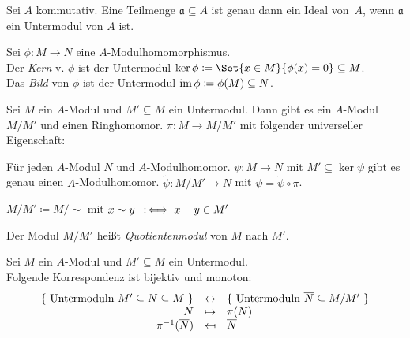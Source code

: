 \documentclass{cheat-sheet}
\newcommand{\aaa}{\mathfrak{a}}
\begin{document}
\begin{bsp}
  Sei $A$ kommutativ.
  Eine Teilmenge $\aaa \subseteq A$ ist genau dann ein Ideal von~$A$, wenn $\aaa$ ein Untermodul von $A$ ist.
\end{bsp}

\begin{defn}
  Sei $\phi : M \to N$ eine $A$-Modulhomomorphismus. \\
  Der \emph{Kern} v. $\phi$ ist der Untermodul $\ker \phi \coloneqq \Set{x \in M}{\phi(x) = 0} \subseteq M$. \\
  Das \emph{Bild} von $\phi$ ist der Untermodul $\operatorname{im} \phi \coloneqq \phi(M) \subseteq N$.
\end{defn}

\begin{prop}
  Sei $M$ ein $A$-Modul und $M' \subseteq M$ ein Untermodul.
  Dann gibt es ein $A$-Modul $M/M'$ und einen Ringhomomor. $\pi : M \to M/M'$ mit folgender universeller Eigenschaft:

  \hfill\begin{minipage}{0.95 \linewidth}
    Für jeden $A$-Modul $N$ und $A$-Modulhomomor. $\psi : M \to N$ mit $M' \subseteq \ker \psi$ gibt es genau einen $A$-Modulhomomor. $\widetilde{\psi} : M/M' \to N$ mit $\psi = \widetilde{\psi} \circ \pi$.
  \end{minipage}
\end{prop}

\begin{konstr}
  $M/M' \coloneqq M/{\sim}$ \enspace mit \enspace $x \sim y \enspace:\!\iff x - y \in M'$
\end{konstr}

\begin{defn}
  Der Modul $M/M'$ heißt \emph{Quotientenmodul} von $M$ nach $M'$.
\end{defn}

\begin{prop}
  Sei $M$ ein $A$-Modul und $M' \subseteq M$ ein Untermodul. \\
  Folgende Korrespondenz ist bijektiv und monoton:
  \[
    \begin{array}{r c l}
      \{ \text{ Untermoduln $M' \subseteq N \subseteq M$ } \} & \leftrightarrow & \{ \text{ Untermoduln $\overline{N} \subseteq M/M'$ } \} \\
      N & \mapsto & \pi(N) \\
      \pi^{-1}(\overline{N}) & \mapsfrom & \overline{N}
    \end{array}
  \]
\end{prop}
\end{document}
